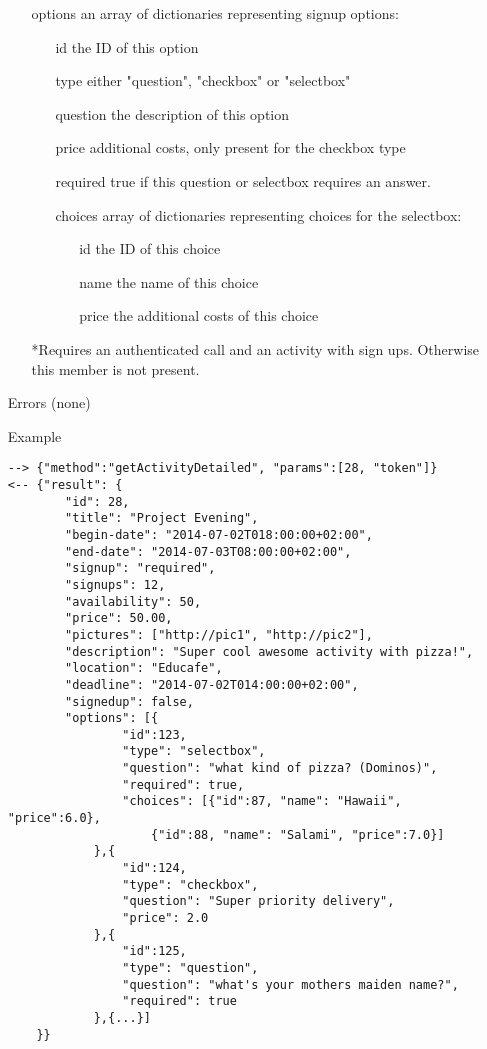 \documentclass[a4paper]{scrreprt}
\begin{document}
\begin{enumerate}
\begin{enumerate}
    \item[options] an array of dictionaries representing signup options:
    	\begin{enumerate}
        \item[id] the ID of this option
        \item[type] either "question", "checkbox" or "selectbox"
        \item[question] the description of this option
        \item[price] additional costs, only present for the checkbox type
        \item[required] true if this question or selectbox requires an answer.
        \item[choices] array of dictionaries representing choices for the selectbox:
        	\begin{enumerate}
            	\item[id] the ID of this choice
                \item[name] the name of this choice
                \item[price] the additional costs of this choice
            \end{enumerate}
        \end{enumerate}
        \item[] *Requires an authenticated call and an activity with sign ups. Otherwise this member is not present.
	\end{enumerate}
\item[Errors] (none)
\item[Example] 
\begin{lstlisting}
--> {"method":"getActivityDetailed", "params":[28, "token"]}
<-- {"result": {
        "id": 28,
        "title": "Project Evening", 
        "begin-date": "2014-07-02T018:00:00+02:00",
        "end-date": "2014-07-03T08:00:00+02:00",
        "signup": "required",
        "signups": 12,
        "availability": 50,
        "price": 50.00,
        "pictures": ["http://pic1", "http://pic2"],
        "description": "Super cool awesome activity with pizza!",
        "location": "Educafe",
        "deadline": "2014-07-02T014:00:00+02:00",
        "signedup": false,
        "options": [{
            	"id":123,
                "type": "selectbox",
                "question": "what kind of pizza? (Dominos)",
                "required": true,
                "choices": [{"id":87, "name": "Hawaii", "price":6.0},
                    {"id":88, "name": "Salami", "price":7.0}]
            },{
            	"id":124,
                "type": "checkbox",
                "question": "Super priority delivery",
                "price": 2.0
            },{
            	"id":125,
                "type": "question",
                "question": "what's your mothers maiden name?",
                "required": true
            },{...}]
    }}
\end{lstlisting}
\end{enumerate}
\end{document}
